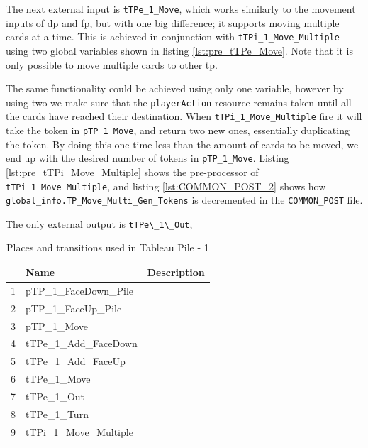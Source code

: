 \documentclass[runningheads,a4paper]{llncs}
\newcommand{\GPenSIM}{../GPenSIM}
\begin{document}
The next external input is \verb!tTPe_1_Move!, which works similarly to the movement inputs of \ac{dp} and \ac{fp}, but with one big difference; it supports moving multiple cards at a time. This is achieved in conjunction with \verb!tTPi_1_Move_Multiple! using two global variables shown in listing \ref{lst:pre_tTPe_Move}. Note that it is only possible to move multiple cards to other \ac{tp}.


The same functionality could be achieved using only one variable, however by using two we make sure that the \verb!playerAction! resource remains taken until all the cards have reached their destination. When \verb!tTPi_1_Move_Multiple! fire it will take the token in \verb!pTP_1_Move!, and return two new ones, essentially duplicating the token. By doing this one time less than the amount of cards to be moved, we end up with the desired number of tokens in \verb!pTP_1_Move!. Listing \ref{lst:pre_tTPi_Move_Multiple} shows the pre-processor of \verb!tTPi_1_Move_Multiple!, and listing \ref{lst:COMMON_POST_2} shows how \verb!global_info.TP_Move_Multi_Gen_Tokens! is decremented in the \verb!COMMON_POST! file.




The only external output is \verb!tTPe\_1\_Out!, 
\begin{table}
	\caption{Places and transitions used in Tableau Pile - 1}
	\begin{tabular}{|l|l|l|}
		\hline
		& Name & Description \\
		\hline
		1 & pTP\_1\_FaceDown\_Pile    &  \\ \hline
		2 & pTP\_1\_FaceUp\_Pile      &  \\ \hline
		3 & pTP\_1\_Move              &  \\ \hline
		4 & tTPe\_1\_Add\_FaceDown   &    \\ \hline
		5 & tTPe\_1\_Add\_FaceUp     &    \\ \hline
		6 & tTPe\_1\_Move            &    \\ \hline
		7 & tTPe\_1\_Out             &    \\ \hline
		8 & tTPe\_1\_Turn            &    \\ \hline
		9 & tTPi\_1\_Move\_Multiple  &    \\ \hline
	\end{tabular}
\end{table}
\clearpage
\end{document}
